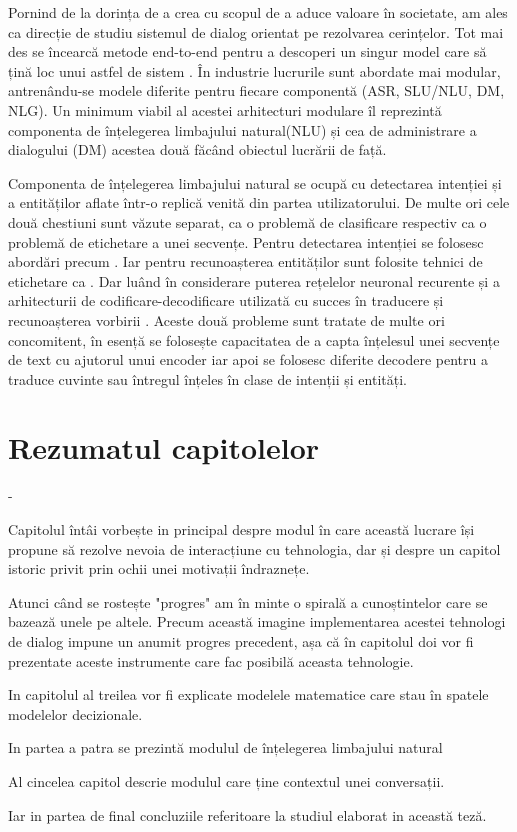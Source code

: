 Pornind de la dorința de a crea cu scopul de a aduce valoare în societate, am ales ca direcție de studiu sistemul de dialog orientat pe rezolvarea cerințelor. Tot mai des se încearcă metode end-to-end pentru a descoperi un singur model care să țină loc unui astfel de sistem \cite{end-to-end foal oriented}. În industrie lucrurile sunt abordate mai modular, antrenându-se modele diferite pentru fiecare componentă (ASR, SLU/NLU, DM, NLG). Un minimum viabil al acestei arhitecturi modulare îl reprezintă componenta de înțelegerea limbajului natural(NLU) și cea de administrare a dialogului (DM) acestea două făcând obiectul lucrării de față.

Componenta de înțelegerea limbajului natural se ocupă cu detectarea intenției și a entităților aflate într-o replică venită din partea utilizatorului. De multe ori cele două chestiuni sunt văzute separat, ca o problemă de clasificare respectiv ca o problemă de etichetare a unei secvențe.
Pentru detectarea intenției se folosesc abordări precum \cite{id_classifiers}. Iar pentru recunoașterea entităților sunt folosite tehnici de etichetare ca \cite{scipy_numpyeq_labeling}. Dar luând în considerare puterea rețelelor neuronal recurente și a arhitecturii de codificare-decodificare utilizată cu succes în traducere și recunoașterea vorbirii \cite{luoung_bahdanau_maning}. Aceste două probleme sunt tratate de multe ori concomitent, în esență se folosește capacitatea de a capta înțelesul unei secvențe de text cu ajutorul unui encoder iar apoi se folosesc diferite decodere pentru a traduce cuvinte sau întregul înțeles în clase de intenții și entități.



\section{Rezumatul capitolelor}
\begin{description}
	\item[Introducere]  - 
	
	Capitolul întâi vorbește in principal despre modul în care această lucrare își propune să rezolve nevoia de interacțiune cu tehnologia, dar și despre un capitol istoric privit prin ochii unei motivații îndraznețe.
	\item
	Atunci când se rostește "progres" am în minte o  spirală a cunoștintelor care se bazează unele pe altele. Precum această imagine implementarea acestei tehnologi de dialog impune un anumit progres precedent, așa că în capitolul doi vor fi prezentate aceste instrumente care fac posibilă aceasta tehnologie.
	\item
	In capitolul al treilea vor fi explicate modelele matematice care stau în spatele modelelor decizionale.
	\item
	In partea a patra se prezintă modulul de înțelegerea limbajului natural
	\item
	Al cincelea capitol descrie modulul care ține contextul unei conversații.
	\item
	Iar in partea de final concluziile referitoare la studiul elaborat in această teză.
\end{description}

